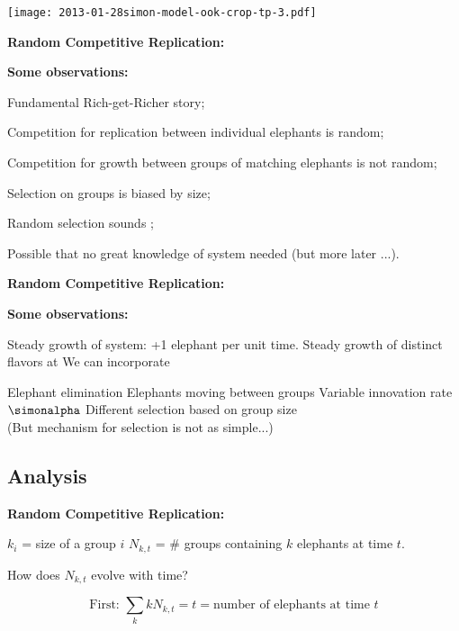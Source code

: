   
    \texttt{[image: 2013-01-28simon-model-ook-crop-tp-3.pdf]}
  
  

  \textbf{Random Competitive Replication:}

  \textbf{Some observations:}
  
   
    Fundamental \alert{Rich-get-Richer} story;
   
    Competition for replication between individual elephants is random;
   
    Competition for growth between groups of matching elephants is not random;
   
    Selection on groups is biased by size;
   
    Random selection sounds ;
   
    Possible that no great knowledge of system needed (but more later ...).
  
  



  \textbf{Random Competitive Replication:}

  \textbf{Some observations:}
  
   Steady growth of system: +1 elephant per unit time.
   Steady growth of distinct flavors at 
   We can incorporate 
    
     Elephant elimination
     Elephants moving between groups
     Variable innovation rate $\simonalpha$
     Different selection based on group size\\
      {(But mechanism for selection is not as simple...)}
    
  
  


\subsection{Analysis}

  \textbf{Random Competitive Replication:}

  
  
     $k_i$ = size of a group $i$
     $N_{k,t}$ = \# groups containing $k$ elephants at time $t$.
  

  \bigskip

  { How does $N_{k,t}$ evolve with time?}

  \bigskip

  {$$ \mbox{First:\ } \sum_{k} k N_{k,t} = t = \mbox{number of elephants at time $t$}$$}
  


